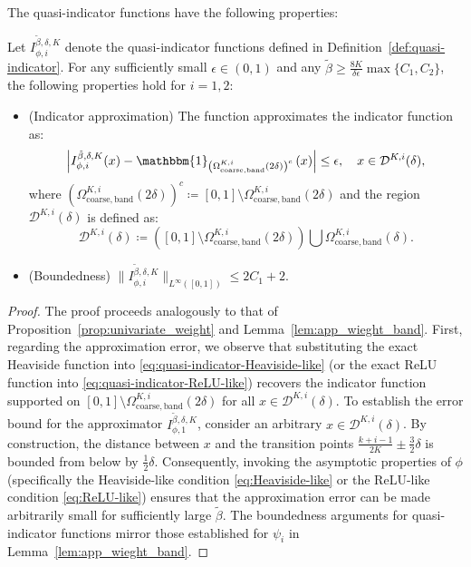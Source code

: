 \documentclass[11pt]{article}
\begin{document}
The quasi-indicator functions have the following properties:
\begin{proposition}
    Let $I_{\phi,i}^{\tilde{\beta},{\delta},K}$ denote the quasi-indicator functions defined in Definition~\ref{def:quasi-indicator}. For any sufficiently small $\epsilon \in (0,1)$ and any $\tilde{\beta} \geq \frac{8 K}{{\delta} \epsilon } \max\{C_1, C_2\}$, the following properties hold for $i=1,2$:
    \begin{itemize}
        \item (Indicator approximation) The function approximates the indicator function as:
        \begin{equation*}
            \left| I_{\phi,i}^{\tilde{\beta},{\delta},K} (x)- \mathbbm{1}_{\left(\Omega_{\mathrm{coarse,band}}^{K,i}(2 \delta)\right)^c} \left( x \right)\right| \leq \epsilon, \quad x \in \mathcal{D}^{K,i}({\delta}),
        \end{equation*}
        where $\left(\Omega_{\mathrm{coarse,band}}^{K,i}(2 \delta)\right)^c \coloneqq [0,1]  \setminus \Omega_{\mathrm{coarse,band}}^{K,i}(2 \delta)$ and the region $\mathcal{D}^{K,i}({\delta})$ is defined as:
        \begin{equation*}
            \mathcal{D}^{K,i}({\delta})\coloneqq \left( [0,1]  \setminus \Omega_{\mathrm{coarse,band}}^{K,i}(2 {\delta})  \right) \bigcup  \Omega_{\mathrm{coarse,band}}^{K,i}( {\delta}).
        \end{equation*}
        \item (Boundedness) $\|I_{\phi,i}^{\tilde{\beta}, {\delta}, K}\|_{L^{\infty}([0,1])} \leq 2C_1 +2$.
    \end{itemize}
    \label{prop:quasi-indicator}
\end{proposition}

\begin{proof}
    The proof proceeds analogously to that of Proposition~\ref{prop:univariate_weight} and Lemma~\ref{lem:app_wieght_band}. First, regarding the approximation error, we observe that substituting the exact Heaviside function into \eqref{eq:quasi-indicator-Heaviside-like} (or the exact ReLU function into \eqref{eq:quasi-indicator-ReLU-like}) recovers the indicator function supported on $[0,1] \setminus \Omega_{\mathrm{coarse,band}}^{K,i}(2 {\delta})$ for all $x \in \mathcal{D}^{K,i}({\delta})$. To establish the error bound for the approximator $I_{\phi,1}^{\tilde{\beta},{\delta},K}$, consider an arbitrary $x \in \mathcal{D}^{K,i}({\delta})$. By construction, the distance between $x$ and the transition points $\frac{k+i-1}{2K} \pm \frac{3}{2} {\delta}$ is bounded from below by $\frac{1}{2} {\delta}$. Consequently, invoking the asymptotic properties of $\phi$ (specifically the Heaviside-like condition \eqref{eq:Heaviside-like} or the ReLU-like condition \eqref{eq:ReLU-like}) ensures that the approximation error can be made arbitrarily small for sufficiently large $\tilde{\beta}$. The boundedness arguments for quasi-indicator functions  mirror those established for $\psi_i$ in Lemma~\ref{lem:app_wieght_band}.
\end{proof}
\end{document}
